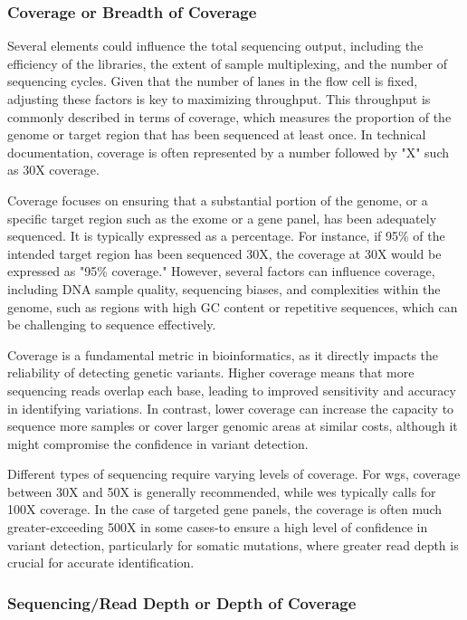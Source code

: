 \subsubsection{\textbf{Coverage or Breadth of Coverage}} \label{subsubsec:ngs_coverage}

Several elements could influence the total sequencing output, including the efficiency of the libraries, the extent of sample multiplexing, and the number of sequencing cycles. Given that the number of lanes in the flow cell is fixed, adjusting these factors is key to maximizing throughput. This throughput is commonly described in terms of coverage, which measures the proportion of the genome or target region that has been sequenced at least once. In technical documentation, coverage is often represented by a number followed by "X" such as 30X coverage. \cite{Larson2023}

Coverage focuses on ensuring that a substantial portion of the genome, or a specific target region such as the exome or a gene panel, has been adequately sequenced. It is typically expressed as a percentage. For instance, if 95\% of the intended target region has been sequenced 30X, the coverage at 30X would be expressed as "95\% coverage." However, several factors can influence coverage, including DNA sample quality, sequencing biases, and complexities within the genome, such as regions with high GC content or repetitive sequences, which can be challenging to sequence effectively. \cite{3billion2023}

Coverage is a fundamental metric in bioinformatics, as it directly impacts the reliability of detecting genetic variants. Higher coverage means that more sequencing reads overlap each base, leading to improved sensitivity and accuracy in identifying variations. In contrast, lower coverage can increase the capacity to sequence more samples or cover larger genomic areas at similar costs, although it might compromise the confidence in variant detection. \cite{Larson2023}

Different types of sequencing require varying levels of coverage. For \ac{wgs}, coverage between 30X and 50X is generally recommended, while \ac{wes} typically calls for 100X coverage. In the case of targeted gene panels, the coverage is often much greater-exceeding 500X in some cases-to ensure a high level of confidence in variant detection, particularly for somatic mutations, where greater read depth is crucial for accurate identification. \cite{Larson2023}


\subsubsection{\textbf{Sequencing/Read Depth or Depth of Coverage}} \label{subsubsec:ngs_ard}

